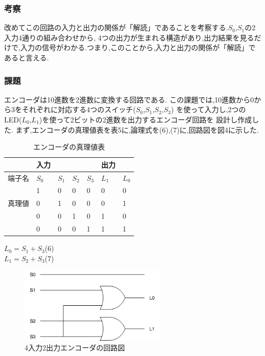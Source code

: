 \documentclass[twocolumn, 10pt,a4j]{jsarticle}
\begin{document}
  \subsubsection{考察}
  改めてこの回路の入力と出力の関係が「解読」であることを考察する.$S_{0}$,$S_{1}$の2入力4通りの組み合わせから,
  4つの出力が生まれる構造があり,出力結果を見るだけで,入力の信号がわかる.つまり,このことから,入力と出力の関係が「解読」であると言える.
  \subsubsection{課題}
  エンコーダは10進数を2進数に変換する回路である.
  この課題では,10進数から0から3をそれぞれに対応する4つのスイッチ($S_{0}$,$S_{1}$,$S_{2}$,$S_{3}$)
  を使って入力し,2つのLED($L_{0}$,$L_{1}$)を使って2ビットの2進数を出力するエンコーダ回路を
  設計し作成した.
  まず,エンコーダの真理値表を表5に,論理式を(6),(7)に,回路図を図4に示した.
  \begin{table}[H]
  \centering
  \caption{エンコーダの真理値表}
  \label{my-label}
  \begin{tabular}{l|llll|ll}
      & 入力      &         &         &         & 出力      &         \\ \hline
  端子名 & $S_{0}$ & $S_{1}$ & $S_{2}$ & $S_{3}$ & $L_{1}$ & $L_{0}$ \\ \hline
      & 1       & 0       & 0       & 0       & 0    & 0    \\
  真理値 & 0       & 1       & 0       & 0       & 0    & 1    \\
      & 0       & 0       & 1       & 0       & 1    & 0    \\
      & 0       & 0       & 0       & 1       & 1    & 1   
  \end{tabular}
  \end{table}
  \begin{center}
    $L_{0} = S_{1}+S_{3}$\quad(6) \\
    $L_{1} = S_{2}+S_{3}$\quad(7) \\
  \end{center}
  \begin{figure}[H]
    \begin{center}
      \includegraphics[width=7cm]{../img/half_adder/encoder.png}
      \caption{4入力2出力エンコーダの回路図}
    \end{center}
  \end{figure}
\end{document}
